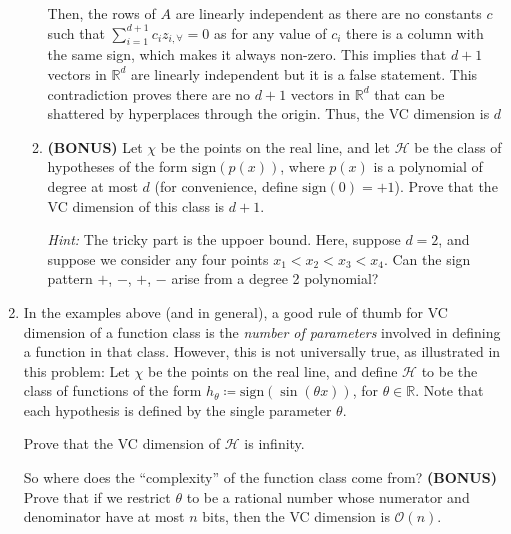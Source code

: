 \documentclass[12pt]{article}
\newcommand{\sign}[1]{\text{sign}(#1)}
\newcommand{\BigO}[1]{\mathcal{O}\left( #1 \right)}
\begin{document}
\begin{enumerate}
\begin{enumerate}
Then, the rows of $A$ are linearly independent as there are no constants $c$ such that $\sum_{i=1}^{d+1}c_{i}z_{i,\forall} = 0$ as for any value of $c_{i}$ there is a column with the same sign, which makes it always non-zero. This implies that $d+1$ vectors in $\mathbb{R}^{d}$ are linearly independent but it is a false statement. This contradiction proves there are no $d+1$ vectors in $\mathbb{R}^{d}$ that can be shattered by hyperplaces through the origin. Thus, the VC dimension is $d$

\item {\bf (BONUS)} Let $\chi$ be the points on the real line, and let $\mathcal{H}$ be the class of hypotheses of the form $\sign{p(x)}$, where $p(x)$ is a polynomial of degree at most $d$ (for convenience, define $\sign{0} = +1$). Prove that the VC dimension of this class is $d+1$. 

{\em Hint:} The tricky part is the uppoer bound. Here, suppose $d = 2$, and suppose we consider any four points $x_{1} < x_{2} < x_{3} < x_{4}$. Can the sign pattern $+$, $-$, $+$, $-$ arise from a degree 2 polynomial?
\end{enumerate}

\item In the examples above (and in general), a good rule of thumb for VC dimension of a function class is the {\em number of parameters} involved in defining a function in that class. However, this is not universally true, as illustrated in this problem: Let $\chi$ be the points on the real line, and define $\mathcal{H}$ to be the class of functions of the form $h_{\theta} \coloneqq \sign{\sin(\theta x)}$, for $\theta \in \mathbb{R}$. Note that each hypothesis is defined by the single parameter $\theta$.

Prove that the VC dimension of $\mathcal{H}$ is infinity.

So where does the ``complexity'' of the function class come from? {\bf (BONUS)} Prove that if we restrict $\theta$ to be a rational number whose numerator and denominator have at most $n$ bits, then the VC dimension is $\BigO{n}$.
\end{enumerate}
 
\end{document}
